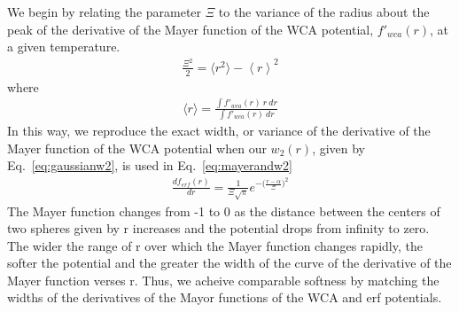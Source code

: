 \documentclass[letterpaper,twocolumn,amsmath,amssymb,prb]{revtex4-1}
\begin{document}
We begin by relating the parameter $\Xi$ to the variance of the radius 
about the peak of the derivative of the Mayer function 
of the WCA potential, $f'_{wca}(r)$,
at a given temperature.
\begin{align}
    \frac{\Xi^2}{2}= \langle r^2\rangle-\left<r\right>^2
\end{align}
where
\begin{align}
    \langle r\rangle = \frac{\int f'_{wca}(r)~r~dr}{\int f'_{wca}(r)~dr}
\end{align}
In this way, we reproduce the exact width, or variance of the derivative 
of the Mayer function of the WCA potential when our $w_2(r)$, given by 
Eq.~\ref{eq:gaussianw2}, is used in     
Eq.~\ref{eq:mayerandw2} 
\begin{align}
   \frac{df_{erf}(r)}{dr}=\frac{1}{\Xi\sqrt{\pi}}e^{-\big(\frac{r-\alpha}{\Xi}\big)^2}
\end{align}
The Mayer function changes from -1 to 0 as the distance between the centers
of two spheres given by r increases and the potential drops from infinity to zero. 
The wider the range of r over which the Mayer function changes rapidly, 
the softer the potential and the greater the width of the curve of the 
derivative of the Mayer function verses r. Thus, we acheive comparable 
softness by matching the widths of the derivatives of the 
Mayor functions of the WCA and erf potentials. 

\end{document}
